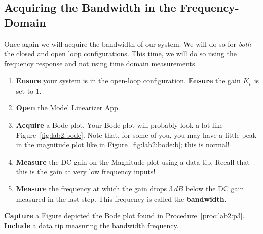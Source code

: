 \subsection{Acquiring the Bandwidth in the Frequency-Domain}
Once again we will acquire the bandwidth of our system. We will do so for
\emph{both} the closed and open loop configurations. This time, we will do
so using the frequency response and not using time domain measurements.
%
\begin{procedure}[label={proc:lab2:p3}]
  \begin{enumerate}[label=(\arabic*)]
    \item{
      \textbf{Ensure} your system is in the open-loop configuration.
      \textbf{Ensure} the gain \(K_p\) is set to \(1.\)
    }
    \item{
      \textbf{Open} the Model Linearizer App.
    }
    \item{
      \textbf{Acquire} a Bode plot. Your Bode plot will probably look a lot
      like Figure~\ref{fig:lab2:bode}. Note that, for some of you, you may
      have a little peak in the magnitude plot like in
      Figure~\ref{fig:lab2:bode:b}; this is normal!
    }
    \item{
      \textbf{Measure} the DC gain on the Magnitude plot using a data tip.
      Recall that this is the gain at very low frequency inputs!
    }
    \item{
      \textbf{Measure} the frequency at which the gain drops \(\SI{3}{dB}\)
      below the DC gain measured in the last step. This frequency
      is called the \textbf{bandwidth}.
    }
  \end{enumerate}
\end{procedure}
%
\begin{deliverable}[label={lab2:d3a}]
  \textbf{Capture} a Figure depicted the Bode plot found in
  Procedure~\ref{proc:lab2:p3}. \textbf{Include} a data tip measuring
  the bandwidth frequency.
\end{deliverable}
%
